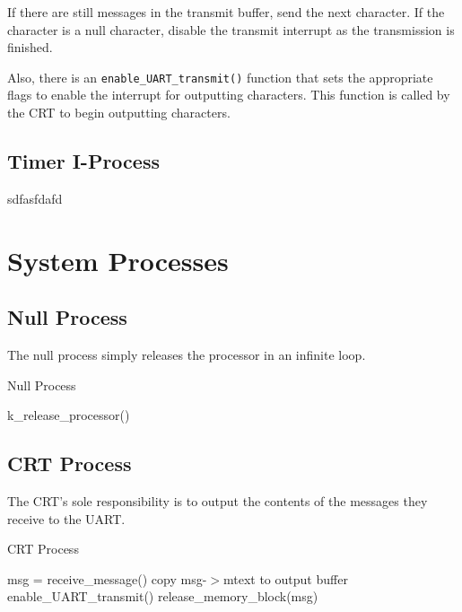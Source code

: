 \documentclass[12pt]{report}
\begin{document}
If there are still messages in the transmit buffer, send the next character. If the character is a null character, disable the transmit interrupt as the transmission is finished.


Also, there is an \texttt{enable_UART_transmit()} function that sets the appropriate flags to enable the interrupt for outputting characters. This function is called by the CRT to begin outputting characters.


\subsection{Timer I-Process}

sdfasfdafd


\section{System Processes}

\subsection{Null Process}

The null process simply releases the processor in an infinite loop.

\begin{algorithm}[H]
	\caption{Null Process}
	\begin{algorithmic}[1]
				\State k_release_processor()
			\EndWhile
		\EndFunction		
	\end{algorithmic}
\end{algorithm}

\subsection{CRT Process}

The CRT's sole responsibility is to output the contents of the messages they receive to the UART.

\begin{algorithm}[H]
	\caption{CRT Process}
	\begin{algorithmic}[1]
	      \State msg = receive\_message()
	      \State copy msg-$>$mtext to output buffer
	      \State enable\_UART\_transmit()
	      \State release\_memory\_block(msg)
	    \EndWhile
	  \EndFunction
	\end{algorithmic}
\end{algorithm}
\end{document}
